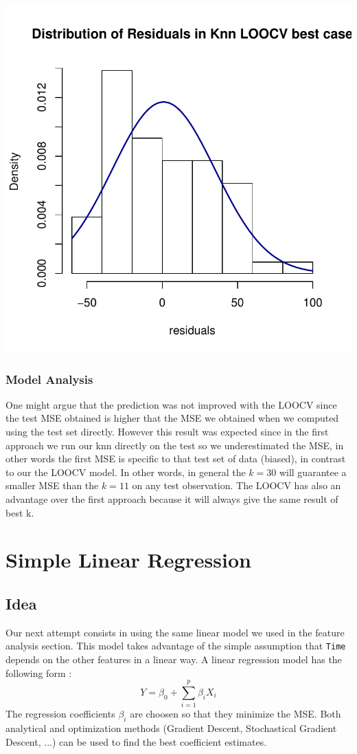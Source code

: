\documentclass[]{report}
\begin{document}
\begin{center}
	\includegraphics[width=0.8\linewidth]{Figures/knn_predicted_LOOCV_residuals.pdf}
	\label{fig:knn_predicted_residuals_LOOCV}
\end{center}



\subsubsection{Model Analysis}
One might argue that the prediction was not improved with the LOOCV since the test MSE obtained is higher that the MSE we obtained when we computed using the test set directly. However this result was expected since in the first approach we run our knn directly on the test so we underestimated the MSE, in other words the first MSE is specific to that test set of data (biased), in contrast to our the LOOCV model. In other words, in general the $k=30$ will guarantee a smaller MSE than the $k=11$ on any test observation.
The LOOCV has also an advantage over the first approach because it will always give the same result of best k.

\section{Simple Linear Regression}
\subsection{Idea}
Our next attempt consists in using the same linear model we used in the feature analysis section. This model takes advantage of the simple assumption that \texttt{Time} depends on the other features in a linear way. A linear regression model has the following form :
$$
Y = \beta_0 + \sum_{i = 1}^{p} \beta_i X_i
$$
The regression coefficients $\beta_i$ are choosen so that they minimize the MSE. Both analytical and optimization methods (Gradient Descent, Stochastical Gradient Descent, ...) can be used to find the best coefficient estimates.
\end{document}
